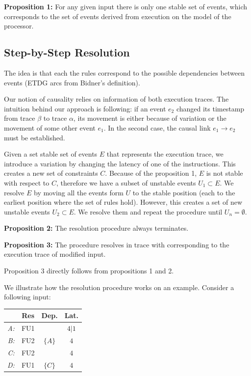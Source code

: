\documentclass[12pt, a4paper]{memoir} %
\newcounter{example}
\begin{document}
\textbf{Proposition 1:} For any given input there is only one stable set of events, which corresponds to the set of events derived from execution on the model of the processor.

\subsection{Step-by-Step Resolution}

The idea is that each the rules correspond to the possible dependencies between events (ETDG arcs from Bidner's definition).

Our notion of causality relies on information of both execution traces. The intuition behind our approach is following: if an event $e_2$ changed its timestamp from trace $\beta$ to trace $\alpha$, its movement is either because of variation or the movement of some other event $e_1$. In the second case, the causal link $e_1 \rightarrow e_2$ must be established.

Given a set stable set of events $E$ that represents the execution trace, we introduce a variation by changing the latency of one of the instructions. This creates a new set of constraints $C$. Because of the proposition 1, $E$ is not stable with respect to $C$, therefore we have a subset of unstable events $U_1 \subset E$. We resolve $E$ by moving all the events form $U$ to the stable position (each to the earliest position where the set of rules hold). However, this creates a set of new unstable events $U_2 \subset E$. We resolve them and repeat the procedure until $U_n = \emptyset$.

\textbf{Proposition 2:}
The resolution procedure always terminates.

\textbf{Proposition 3:}
The procedure resolves in trace with corresponding to the execution trace of modified input.

Proposition 3 directly follows from propositions 1 and 2.

We illustrate how the resolution procedure works on an example. Consider a following input:

\begin{tabular}{r|ccc}
 & Res & Dep. & Lat. \\ \hline
\textit{A:} & FU1 &  & $4|1$ \\
\textit{B:} & FU2 & $\{A\}$ & $4$ \\
\textit{C:} & FU2 &  & $4$ \\
\textit{D:} & FU1 & $\{C\}$ & $4$ \\
\end{tabular}
\end{document}
